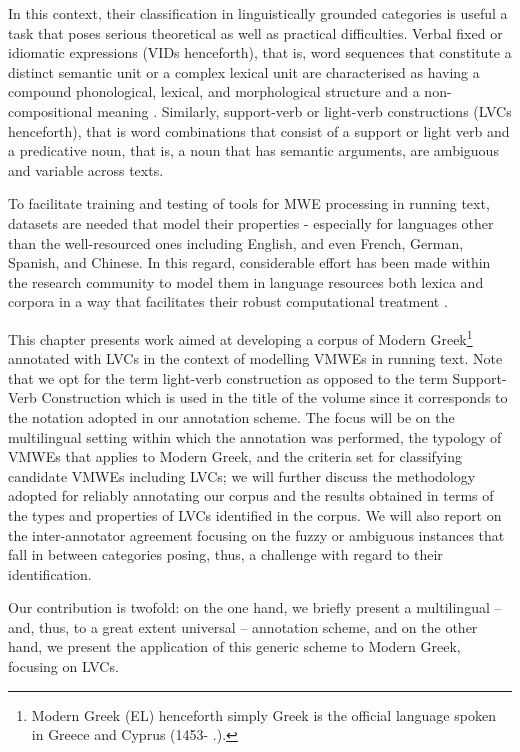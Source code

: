 \documentclass[output=paper,colorlinks,citecolor=brown]{langscibook}
\begin{document}
In this context, their classification in linguistically grounded categories is useful \textemdash a task that poses serious theoretical as well as practical difficulties. Verbal fixed or idiomatic expressions (VIDs henceforth), that is, word sequences that constitute a distinct semantic unit or a complex lexical unit are characterised as having a compound phonological, lexical, and morphological structure and a non-compositional meaning \citep{gross_1982}. Similarly, support-verb or light-verb constructions (LVCs henceforth), that is word combinations that consist of a support or light verb and a predicative noun, that is, a noun that has semantic arguments, are ambiguous and variable across texts.

To facilitate training and testing of tools for MWE processing in running text, datasets are needed that model their properties - especially for languages other than the well-resourced ones including English, and even French, German, Spanish, and Chinese. In this regard, considerable effort has been made within the research community to model them in language resources \textemdash both lexica and corpora \textemdash in a way that facilitates their robust computational treatment \citep{Constant-et-al}.  


This chapter presents work aimed at developing a corpus of Modern Greek\footnote{Modern Greek (EL) \textemdash henceforth simply Greek \textemdash is the official language spoken in Greece and Cyprus (1453- .).} annotated with LVCs in the context of modelling VMWEs in running text. Note that we opt for the term light-verb construction as opposed to the term Support-Verb Construction which is used in the title of the volume since it corresponds to the notation adopted in our annotation scheme. The focus will be on the multilingual setting within which the annotation was performed, the typology of VMWEs that applies to Modern Greek, and the criteria set for classifying candidate VMWEs including LVCs; we will further discuss the methodology adopted for reliably annotating our corpus and the results obtained in terms of the types and properties of LVCs identified in the corpus. We will also report on the inter-annotator agreement focusing on the fuzzy or ambiguous instances that fall in between categories posing, thus, a challenge with regard to their identification.

Our contribution is twofold: on the one hand, we briefly present a multilingual -- and, thus, to a great extent universal -- annotation scheme, and on the other hand, we present the application of this generic scheme to Modern Greek, focusing on LVCs.
\end{document}
